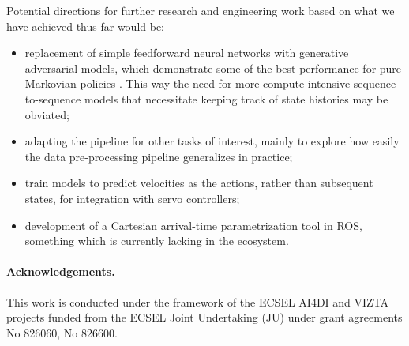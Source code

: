 \documentclass{article}
\begin{document}
Potential directions for further research and engineering work based on what we have achieved thus far would be:
\begin{itemize}
	\item replacement of simple feedforward neural networks with generative adversarial models, which demonstrate some of the best performance for pure Markovian policies \citep{ho2016generative}. This way the need for more compute-intensive sequence-to-sequence models that necessitate keeping track of state histories may be obviated;
	\item adapting the pipeline for other tasks of interest, mainly to explore how easily the data pre-processing pipeline generalizes in practice;
	\item train models to predict velocities as the actions, rather than subsequent states, for integration with servo controllers;
	\item development of a Cartesian arrival-time parametrization tool in ROS, something which is currently lacking in the ecosystem.
\end{itemize}

\paragraph{Acknowledgements.}  This work is conducted under the framework of the ECSEL AI4DI and VIZTA projects funded from the ECSEL Joint Undertaking (JU) under grant agreements No 826060, No 826600.


\end{document}
